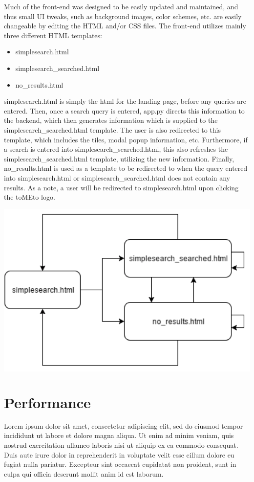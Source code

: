 \documentclass{acm_proc_article-sp}
\begin{document}
Much of the front-end was designed to be easily updated and maintained, and thus small UI tweaks, such as background images, color schemes, etc. are easily changeable by editing the HTML and/or CSS files. The front-end utilizes mainly three different HTML templates:\begin{itemize}
\item simplesearch.html 
\item simplesearch\_searched.html 
\item no\_results.html
\end{itemize}

simplesearch.html is simply the html for the landing page, before any queries are entered. Then, once a search query is entered, app.py directs this information to the backend, which then generates information which is supplied to the simplesearch\_searched.html template. The user is also redirected to this template, which includes the tiles, modal popup information, etc. Furthermore, if a search is entered into simplesearch\_searched.html, this also refreshes the simplesearch\_searched.html template, utilizing the new information. Finally, no\_results.html is used as a template to be redirected to when the query entered into simplesearch.html or simplesearch\_searched.html does not contain any results. As a note, a user will be redirected to simplesearch.html upon clicking the toMEto logo.

\includegraphics[scale=0.5]{p4.png}


\section{Performance}

Lorem ipsum dolor sit amet, consectetur adipiscing elit, sed do eiusmod tempor incididunt ut labore et dolore magna aliqua. Ut enim ad minim veniam, quis nostrud exercitation ullamco laboris nisi ut aliquip ex ea commodo consequat. Duis aute irure dolor in reprehenderit in voluptate velit esse cillum dolore eu fugiat nulla pariatur. Excepteur sint occaecat cupidatat non proident, sunt in culpa qui officia deserunt mollit anim id est laborum.
\end{document}
